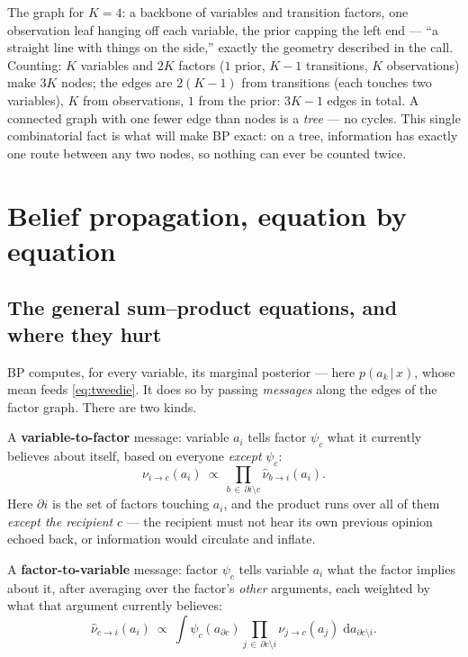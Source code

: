 \documentclass[11pt]{article}
\theoremstyle{definition}
\theoremstyle{remark}
\newcommand{\dd}{\mathrm{d}}
\newcommand{\given}{\,|\,}
\begin{document}
\noindent The graph for $K=4$: a backbone of variables and transition
factors, one observation leaf hanging off each variable, the prior capping
the left end --- ``a straight line with things on the side,'' exactly the
geometry described in the call. Counting: $K$ variables and $2K$ factors
($1$ prior, $K{-}1$ transitions, $K$ observations) make $3K$ nodes; the
edges are $2(K{-}1)$ from transitions (each touches two variables), $K$ from
observations, $1$ from the prior: $3K-1$ edges in total. A connected graph
with one fewer edge than nodes is a \emph{tree} --- no cycles. This single
combinatorial fact is what will make BP exact: on a tree, information has
exactly one route between any two nodes, so nothing can ever be counted
twice.

\section{Belief propagation, equation by equation}\label{sec:bp}

\subsection{The general sum--product equations, and where they hurt}
\label{sec:sumproduct}

BP computes, for every variable, its marginal posterior --- here
$p(a_k\given x)$, whose mean feeds \eqref{eq:tweedie}. It does so by passing
\emph{messages} along the edges of the factor graph. There are two kinds.

A \textbf{variable-to-factor} message: variable $a_i$ tells factor
$\psi_c$ what it currently believes about itself, based on everyone
\emph{except} $\psi_c$:
\begin{equation}\label{eq:v2f}
  \nu_{i\to c}(a_i)\ \propto\
  \prod_{b\,\in\,\partial i\setminus c}\hat\nu_{b\to i}(a_i) .
  \tag{SP1}
\end{equation}
Here $\partial i$ is the set of factors touching $a_i$, and the product runs
over all of them \emph{except the recipient} $c$ --- the recipient must not
hear its own previous opinion echoed back, or information would circulate
and inflate.

A \textbf{factor-to-variable} message: factor $\psi_c$ tells variable
$a_i$ what the factor implies about it, after averaging over the factor's
\emph{other} arguments, each weighted by what that argument currently
believes:
\begin{equation}\label{eq:f2v}
  \hat\nu_{c\to i}(a_i)\ \propto\
  \int\psi_c(a_{\partial c})
  \prod_{j\,\in\,\partial c\setminus i}\nu_{j\to c}(a_j)\;
  \dd a_{\partial c\setminus i} .
  \tag{SP2}
\end{equation}
\end{document}
